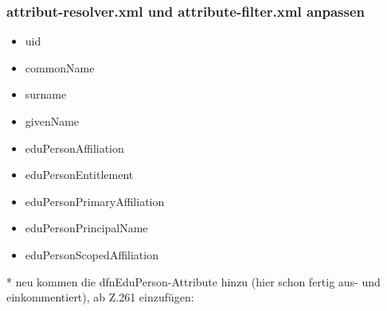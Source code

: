 \subsubsection{attribut-resolver.xml und attribute-filter.xml anpassen}	
\begin{itemize}
\item uid
\item commonName
\item surname
\item givenName
\item eduPersonAffiliation
\item eduPersonEntitlement
\item eduPersonPrimaryAffiliation
\item eduPersonPrincipalName
\item eduPersonScopedAffiliation
\end{itemize}
* neu kommen die dfnEduPerson-Attribute hinzu (hier schon fertig aus- und
einkommentiert), ab Z.261 einzufügen:
